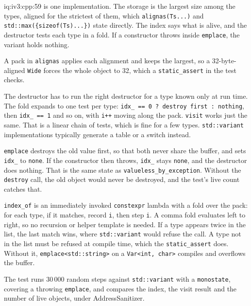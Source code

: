 \begin{solution}{iq:iv3:cpp:59}
 is one implementation. The storage is the largest size among the types, aligned for the strictest of them, which \texttt{alignas(Ts.{}.{}.)} and \texttt{std::max(\{sizeof(Ts).{}.{}.\})} state directly. The index says what is alive, and the destructor tests each type in a fold. If a constructor throws inside \texttt{emplace}, the variant holds nothing.
\label{lst:iv3:cp:var}

A pack in \texttt{alignas} applies each alignment and keeps the largest, so a 32-byte-aligned \texttt{Wide} forces the whole object to 32, which a \texttt{static\_assert} in the test checks.

The destructor has to run the right destructor for a type known only at run time. The fold expands to one test per type: \texttt{idx\_ == 0 ? destroy first : nothing}, then \texttt{idx\_ == 1} and so on, with \texttt{i++} moving along the pack. \texttt{visit} works just the same. That is a linear chain of tests, which is fine for a few types. \texttt{std::variant} implementations typically generate a table or a switch instead.

\texttt{emplace} destroys the old value first, so that both never share the buffer, and sets \texttt{idx\_} to \texttt{none}. If the constructor then throws, \texttt{idx\_} stays \texttt{none}, and the destructor does nothing. That is the same state as \texttt{valueless\_by\_exception}. Without the \texttt{destroy} call, the old object would never be destroyed, and the test's live count catches that.

\texttt{index\_of} is an immediately invoked \texttt{constexpr} lambda with a fold over the pack: for each type, if it matches, record \texttt{i}, then step \texttt{i}. A comma fold evaluates left to right, so no recursion or helper template is needed. If a type appears twice in the list, the last match wins, where \texttt{std::variant} would refuse the call. A type not in the list must be refused at compile time, which the \texttt{static\_assert} does. Without it, \texttt{emplace<std::string>} on a \texttt{Var<int, char>} compiles and overflows the buffer.

The test runs 30\,000 random steps against \texttt{std::variant} with a \texttt{monostate}, covering a throwing \texttt{emplace}, and compares the index, the visit result and the number of live objects, under AddressSanitizer.

\end{solution}

